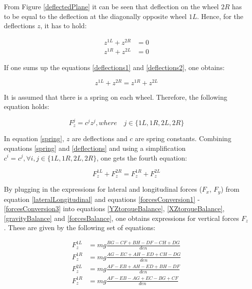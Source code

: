 \documentclass[paper=a4, fontsize=11pt]{scrartcl} %
\numberwithin{equation}{section} %
\numberwithin{figure}{section} %
\numberwithin{table}{section} %
\begin{document}
From Figure \ref{deflectedPlane} it can be seen that deflection on the wheel $2R$ has to be equal to the deflection at the diagonally opposite wheel $1L$. Hence, for the deflections $z$, it has to hold:

\begin{align}
z^{1L} + z^{2R} &= 0 \label{deflections1}\\
z^{1R} + z^{2L} &= 0 \label{deflections2}
\end{align}

If one sums up the equations \ref{deflections1} and \ref{deflections2}, one obtains:

\begin{equation}
z^{1L} + z^{2R} = z^{1R} + z^{2L} \label{deflections} 
\end{equation}

It is assumed that there is a spring on each wheel. Therefore, the following equation holds:

\begin{equation}
F^j_z =c^jz^j, where \quad j \in \{1L,1R,2L,2R \} \label{spring} 
\end{equation}

In equation \ref{spring}, $z$ are deflections and $c$ are spring constants. Combining equations \ref{spring} and \ref{deflections} and using a simplification $c^i = c^j, \forall i,j \in \{1L,1R,2L,2R \}$, one gets the fourth equation:

\begin{equation}
F_z^{1L} + F_z^{2R} = F_z^{1R} + F_z^{2L} \label{forcesBalance} 
\end{equation}

By plugging in the expressions for lateral and longitudinal forces ($F_x$, $F_y$) from equation \ref{lateralLongitudinal} and equations \ref{forcesConversion1} - \ref{forcesConversion3}  into equations \ref{YZtorqueBalance}, \ref{XZtorqueBalance}, \ref{gravityBalance} and \ref{forcesBalance}, one obtains expressions for vertical forces $F_z$. These are given by the following set of equations:

\begin{align}
F^{1L}_z &= mg\frac{BG - CF + BH - DF - CH + DG}{den} \\
F^{1R}_z &= mg\frac{AG - EC + AH - ED + CH - DG}{den} \\
F^{2L}_z &= mg\frac{AF - EB + AH - ED + BH - DF}{den} \\
F^{1R}_z &= mg\frac{AF - EB - AG + EC - BG + CF}{den} \\
\end{align}
\end{document}
